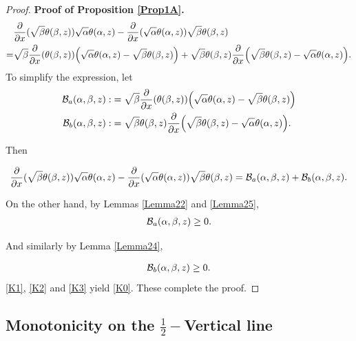 \documentclass[reqno,english]{amsart}
\newtheorem{open problem}{Open Problem}[section]
\newtheorem{open question}{Open Question}[section]
\newtheorem{open questions on hexagonal lattice}{Open Questions on hexagonal lattice}[section]
\begin{document}
\begin{proof}{\bf Proof of Proposition \ref{Prop1A}.}
\begin{equation}\aligned\nonumber
&\frac{\partial}{\partial x}(\sqrt\beta\theta(\beta,z))\sqrt\alpha\theta(\alpha,z)
-\frac{\partial}{\partial x}(\sqrt\alpha\theta(\alpha,z))\sqrt\beta\theta(\beta,z)\\
=&\sqrt\beta\frac{\partial}{\partial x}(\theta(\beta,z))
\Big(
\sqrt\alpha\theta(\alpha,z)
-\sqrt\beta\theta(\beta,z)
\Big)
+\sqrt\beta\theta(\beta,z)\frac{\partial}{\partial x}\Big(
\sqrt\beta\theta(\beta,z)-\sqrt\alpha\theta(\alpha,z)
\Big).
\endaligned\end{equation}
To simplify the expression, let
\begin{equation}\aligned\nonumber
\mathcal{B}_a(\alpha,\beta,z):&=\sqrt\beta\frac{\partial}{\partial x}(\theta(\beta,z))
\Big(
\sqrt\alpha\theta(\alpha,z)
-\sqrt\beta\theta(\beta,z)
\Big)\\
\mathcal{B}_b(\alpha,\beta,z):&=
\sqrt\beta\theta(\beta,z)\frac{\partial}{\partial x}\Big(
\sqrt\beta\theta(\beta,z)-\sqrt\alpha\theta(\alpha,z)
\Big).
\endaligned\end{equation}

Then

\begin{equation}\aligned\label{K1}
\frac{\partial}{\partial x}(\sqrt\beta\theta(\beta,z))\sqrt\alpha\theta(\alpha,z)
-\frac{\partial}{\partial x}(\sqrt\alpha\theta(\alpha,z))\sqrt\beta\theta(\beta,z)
=\mathcal{B}_a(\alpha,\beta,z)+\mathcal{B}_b(\alpha,\beta,z).
\endaligned\end{equation}

On the other hand, by Lemmas \ref{Lemma22} and \ref{Lemma25},
\begin{equation}\aligned\label{K2}
\mathcal{B}_a(\alpha,\beta,z)\geq0.
\endaligned\end{equation}

And similarly by Lemma \ref{Lemma24},


\begin{equation}\aligned\label{K3}
\mathcal{B}_b(\alpha,\beta,z)\geq0.
\endaligned\end{equation}
\eqref{K1}, \eqref{K2} and \eqref{K3} yield \eqref{K0}. These complete the proof.



\end{proof}

\subsection{Monotonicity on the $\frac{1}{2}-$Vertical line}
\end{document}
